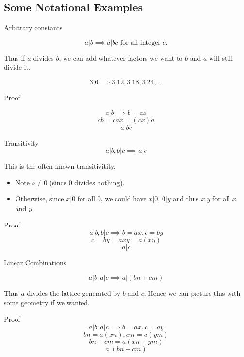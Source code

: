 \documentclass{beamer}
\begin{document}
\subsection{Some Notational Examples}

\begin{frame}{Arbitrary constants}

  $$a|b \implies a|bc \mbox{ for all integer } c.$$
  
  Thus if $a$ divides $b$, we can add whatever factors we want to $b$
  and $a$ will still divide it.

  $$3 | 6 \implies 3|12, 3|18, 3|24, \ldots$$
\end{frame}

\begin{frame}{Proof}
  
  $$a|b \implies b = ax$$
  $$cb = cax = (cx)a$$
  $$a | bc$$

\end{frame}

\begin{frame}{Transitivity}
  $$a|b, b|c \implies a|c$$
  
  This is the often known transitivitity.

  \begin{itemize}
  \item Note $b \ne 0$ (since 0 divides nothing).
  \item Otherwise, since $x|0$ for all $0$, we could have $x|0$, $0|y$
    and thus $x|y$ for all $x$ and $y$.
  \end{itemize}
\end{frame}

\begin{frame}{Proof}
  $$a|b, b|c \implies b = ax, c = by$$
  $$c = by = axy = a(xy)$$
  $$a | c$$
\end{frame}

\begin{frame}{Linear Combinations}

  $$a|b, a|c \implies a|(bn+cm)$$

  Thus $a$ divides the lattice generated by $b$ and $c$. Hence we can
  picture this with some geometry if we wanted.
\end{frame}

\begin{frame}{Proof}
  $$a|b, a|c \implies b = ax, c = ay$$
  $$bn = a(xn), cm = a(ym)$$
  $$bn+cm = a(xn+ym)$$
  $$a | (bn + cm)$$
\end{frame}
\end{document}
